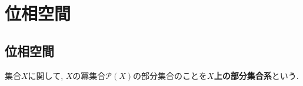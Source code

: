 \begin{comment}
************************************
\section{族}
\begin{Def}
集合$I$ 
から集合$X$への写像$f:I\rightarrow X$が存在するとき, 集合$\{x_i\in X\mid x_i=f(i), i\in I\}$のことを
{\bf $I$を添字集合 index set とする$X$の元の族}という.
\end{Def}
************************************
\end{comment}
\section{位相空間}
\subsection{位相空間}

\begin{Def}
集合$X$に関して, $X$の冪集合$\mathscr{P}(X)$の部分集合のことを{\bf $X$上の部分集合系}という.
\end{Def}

